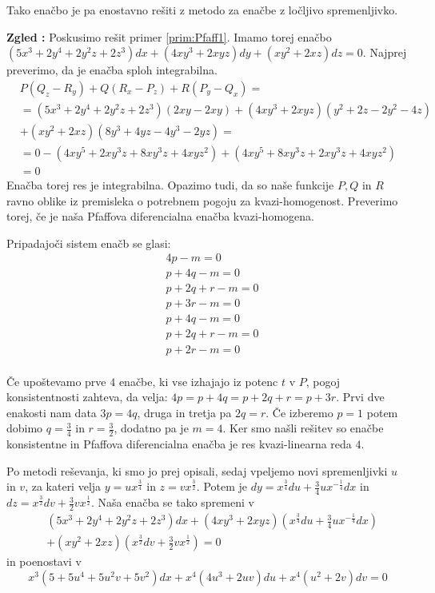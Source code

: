 \documentclass[a4paper, 10pt]{article}
\newcounter{zgledcount}
\newenvironment{zgled}{\begin{flushleft}\refstepcounter{zgledcount}\textbf{Zgled \arabic{zgledcount}:}}{\hfill\end{flushleft}}
\begin{document}
						Tako enačbo je pa enostavno rešiti z metodo za enačbe z ločljivo spremenljivko.
						
						\begin{zgled}
							Poskusimo rešit primer \ref{prim:Pfaff1}. Imamo torej enačbo $(5x^3 + 2y^4 + 2y^2z + 2z^3)dx + (4xy^3 + 2xyz)dy + (xy^2 + 2xz)dz = 0$. Najprej preverimo, da je enačba sploh integrabilna.
							\begin{align*}
								&P(Q_z - R_y) + Q(R_x - P_z) + R(P_y - Q_x) = \\
								&= (5x^3 + 2y^4 + 2y^2z + 2z^3)(2xy - 2xy)
								+ (4xy^3 + 2xyz)(y^2 + 2z - 2y^2 - 4z) \\ 
								&+ (xy^2 + 2xz)(8y^3 + 4yz - 4y^3-2yz) =\\
								&= 0 - (4xy^5 + 2xy^3z + 8xy^3z +4xyz^2) + (4xy^5 + 8xy^3z + 2xy^3z + 4xyz^2) \\ 
								&= 0
							\end{align*}
							Enačba torej res je integrabilna. Opazimo tudi, da so naše funkcije $P, Q$ in $R$ ravno oblike iz premisleka o potrebnem pogoju za kvazi-homogenost. Preverimo torej, če je naša Pfaffova diferencialna enačba kvazi-homogena.
							
							Pripadajoči sistem enačb se glasi: \begin{align*}
								&4p -m = 0 \\
								&p +4q -m = 0 \\
								&p +2q +r -m = 0 \\
								&p +3r -m = 0 \\
								&p +4q -m = 0 \\
								&p +2q +r -m = 0 \\
								&p +2r -m = 0 \\
							\end{align*}
							
							Če upoštevamo prve $4$ enačbe, ki vse izhajajo iz potenc $t$ v $P$, pogoj konsistentnosti zahteva, da velja: $4p = p+4q = p+2q+r = p+3r$. Prvi dve enakosti nam data $3p = 4q$, druga in tretja pa $2q = r$. Če izberemo $p = 1$ potem dobimo $q = \frac{3}{4}$ in $r = \frac{3}{2}$, dodatno pa je $m=4$. Ker smo našli rešitev so enačbe konsistentne in Pfaffova diferencialna enačba je res kvazi-linearna reda $4$.
							
							Po metodi reševanja, ki smo jo prej opisali, sedaj vpeljemo novi spremenljivki $u$ in $v$, za kateri velja $y = ux^{\frac{3}{4}}$ in $z = vx^{\frac{3}{2}}$. Potem je $dy = x^{\frac{3}{4}}du + \frac{3}{4}ux^{-\frac{1}{4}}dx$ in $dz = x^{\frac{3}{2}}dv + \frac{3}{2}vx^{\frac{1}{2}}$. Naša enačba se tako spremeni v \begin{align*}
								&(5x^3 + 2y^4 + 2y^2z + 2z^3)dx + (4xy^3 + 2xyz)(x^{\frac{3}{4}}du + \frac{3}{4}ux^{-\frac{1}{4}}dx) \\ &+ (xy^2 + 2xz)(x^{\frac{3}{2}}dv + \frac{3}{2}vx^{\frac{1}{2}}) = 0
							\end{align*}
							in poenostavi v $$
								x^3(5 + 5u^4 + 5u^2v + 5v^2)dx + x^4(4u^3 + 2uv)du + x^4(u^2 + 2v)dv = 0
							$$
							

\end{zgled}
\end{document}
